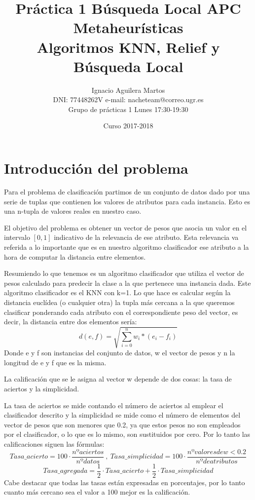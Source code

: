 \documentclass[12pt,a4paper]{article}
\author{Ignacio Aguilera Martos \\
	DNI: 77448262V       e-mail: nacheteam@correo.ugr.es \\
	Grupo de prácticas 1 Lunes 17:30-19:30}
\title{Práctica 1 Búsqueda Local APC \\ Metaheurísticas \\ Algoritmos KNN, Relief y Búsqueda Local}
\date{Curso 2017-2018}
\begin{document}
	\maketitle

	\tableofcontents

	\newpage



	\section{Introducción del problema}
	\label{sec:introProblema}

	Para el problema de clasificación partimos de un conjunto de datos dado por una serie de tuplas que contienen los valores de atributos para cada instancia. Esto es una n-tupla de valores reales en nuestro caso.

	El objetivo del problema es obtener un vector de pesos que asocia un valor en el intervalo $[0,1]$ indicativo de la relevancia de ese atributo. Esta relevancia va referida a lo importante que es en nuestro algoritmo clasificador ese atributo a la hora de computar la distancia entre elementos.

	Resumiendo lo que tenemos es un algoritmo clasificador que utiliza el vector de pesos calculado para predecir la clase a la que pertenece una instancia dada. Este algoritmo clasificador es el KNN con k=1. Lo que hace es calcular según la distancia euclídea (o cualquier otra) la tupla más cercana a la que queremos clasificar ponderando cada atributo con el correspondiente peso del vector, es decir, la distancia entre dos elementos sería:
	$$d(e,f) = \sqrt{\sum_{i=0}^{n}w_i * (e_{i} - f_{i})}$$
	Donde e y f son instancias del conjunto de datos, w el vector de pesos y n la longitud de e y f que es la misma.

	La calificación que se le asigna al vector w depende de dos cosas: la tasa de aciertos y la simplicidad.

	La tasa de aciertos se mide contando el número de aciertos al emplear el clasificador descrito y la simplicidad se mide como el número de elementos del vector de pesos que son menores que 0.2, ya que estos pesos no son empleados por el clasificador, o lo que es lo mismo, son sustituidos por cero. Por lo tanto las calificaciones siguen las fórmulas:
	$$Tasa\_acierto = 100\cdot \frac{nº aciertos}{nº datos} \ , \ Tasa\_simplicidad = 100\cdot \frac{nº valores de w < 0.2}{nº de atributos}$$
	$$Tasa\_agregada = \frac{1}{2}\cdot Tasa\_acierto + \frac{1}{2}\cdot Tasa\_simplicidad$$
	Cabe destacar que todas las tasas están expresadas en porcentajes, por lo tanto cuanto más cercano sea el valor a 100 mejor es la calificación.
\end{document}
